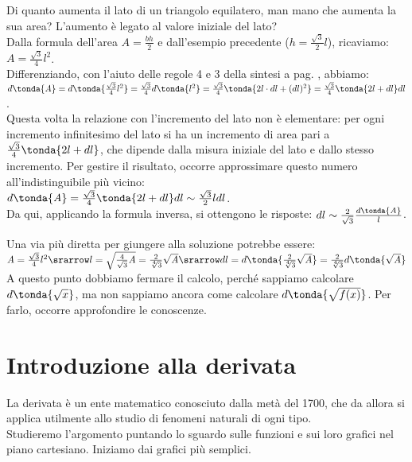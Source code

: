 \begin{esempio}
Di quanto aumenta il lato di un triangolo equilatero,
man mano che aumenta la sua area? L'aumento è legato al valore iniziale del 
lato?\\
Dalla formula dell'area $\mathit{A}=\frac{bh}{2}$ e dall'esempio precedente
($h=\frac{\sqrt{3}}{2}l$), ricaviamo: $\mathit{A}=\frac{\sqrt{3}}{4}l^2$.\\
Differenziando, con l'aiuto delle regole 4 e 3 della sintesi a pag.
\pageref{subsubsec:diff01_diffsint}, abbiamo:\\
$d\tonda{\mathit{A}}=d\tonda{\frac{\sqrt{3}}{4}l^2}=
 \frac{\sqrt{3}}{4}d\tonda{l^2}=
 \frac{\sqrt{3}}{4}\tonda{2l \cdot dl+(dl)^2}=
 \frac{\sqrt{3}}{4}\tonda{2l+dl}dl$.\\
Questa volta la relazione con l'incremento del lato non è elementare: per 
ogni 
incremento infinitesimo del lato si ha un incremento di area pari a 
$\frac{\sqrt{3}}{4}\tonda{2l+dl}$, che dipende dalla misura iniziale del 
lato
e dallo stesso incremento. Per gestire il risultato, occorre approssimare
questo numero all'indistinguibile più vicino:\\
$d\tonda{\mathit{A}}=\frac{\sqrt{3}}{4}\tonda{2l+dl}dl\sim
\frac{\sqrt{3}}{2}ldl$.\\
Da qui, applicando la formula inversa, si ottengono le 
risposte:
$dl\sim\frac{2}{\sqrt{3}}\frac{d\tonda{\mathit{A}}}{l}$.
\begin{osservazione}
 Una via più diretta per giungere alla soluzione potrebbe essere: \\
 $\mathit{A}=\frac{\sqrt{3}}{4}l^2\srarrow 
l=\sqrt{\frac{4}{\sqrt{3}}\mathit{A}}=
 \frac{2}{\sqrt[4]{3}}\sqrt{\mathit{A}}\srarrow dl=
 d\tonda{\frac{2}{\sqrt[4]{3}}\sqrt{\mathit{A}}}=
 \frac{2}{\sqrt[4]{3}}d\tonda{\sqrt{\mathit{A}}}$\\
 A questo punto dobbiamo fermare il calcolo, perché 
 sappiamo calcolare $d\tonda{\sqrt{x}}$, ma 
 non sappiamo ancora come calcolare $d\tonda{\sqrt{f(x)}}$. Per farlo, 
 occorre approfondire le conoscenze.
\end{osservazione}
\end{esempio}

\section{Introduzione alla derivata}
\label{sec:diff01_derivata}
La derivata è un ente matematico conosciuto dalla metà del 1700, che 
da allora si applica utilmente allo studio di fenomeni naturali di ogni 
tipo.\\
Studieremo l'argomento puntando lo sguardo sulle funzioni e sui loro
grafici nel piano cartesiano. Iniziamo dai grafici più semplici.

